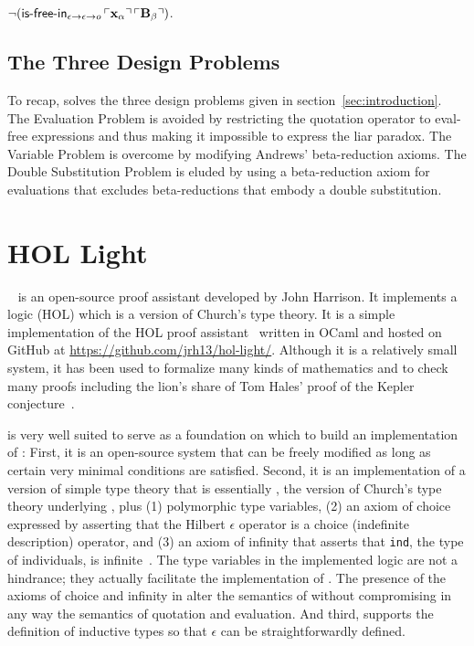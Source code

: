 \documentclass[fleqn]{llncs}
\begin{document}
  \item $\neg(\mbox{\sf is-free-in}_{\epsilon \rightarrow \epsilon \rightarrow o}
    \, \ulcorner\textbf{x}_\alpha\urcorner \, \ulcorner\textbf{B}_\beta\urcorner)$.

\ee

\subsection{The Three Design Problems} 

To recap,
{\churchqe} solves the three design problems given in
section~\ref{sec:introduction}.  The Evaluation Problem is
avoided by restricting the quotation operator to eval-free expressions
and thus making it impossible to express the liar paradox.  The
Variable Problem is overcome by modifying Andrews' beta-reduction
axioms.  The Double Substitution Problem is eluded
by using a beta-reduction axiom for evaluations that excludes
beta-reductions that embody a double substitution.

\section{HOL Light}\label{sec:hol-light}

\HL~\cite{Harrison09} is an open-source proof assistant developed by
John Harrison.  It implements a logic (HOL) which is a version of
Church's type theory.  It is a simple implementation of the HOL proof
assistant~\cite{GordonMelham93} written in OCaml and hosted on GitHub
at \url{https://github.com/jrh13/hol-light/}.  Although it is a
relatively small system, it has been used to formalize many kinds of
mathematics and to check many proofs including the lion's share of Tom
Hales' proof of the Kepler conjecture~\cite{HalesEtAl17}.

{\HL} is very well suited to serve as a foundation on which to build
an implementation of {\churchqe}: First, it is an open-source system
that can be freely modified as long as certain very minimal conditions
are satisfied.  Second, it is an implementation of a version of simple
type theory that is essentially {\qzero}, the version of Church's type
theory underlying {\churchqe}, plus (1) polymorphic type variables,
(2) an axiom of choice expressed by asserting that the Hilbert
$\epsilon$ operator is a choice (indefinite description) operator, and
(3) an axiom of infinity that asserts that \texttt{ind}, the type of
individuals, is infinite~\cite{Harrison09}.  The type variables in the
implemented logic are not a hindrance; they actually facilitate the
implementation of {\churchqe}.  The presence of the axioms of choice
and infinity in {\HL} alter the semantics of {\churchqe} without
compromising in any way the semantics of quotation and evaluation.
And third, \HL{} supports the definition of inductive types so that
$\epsilon$ can be straightforwardly defined.
\end{document}
